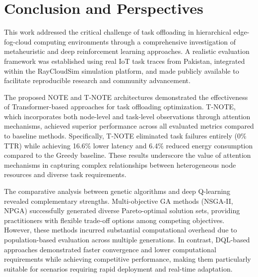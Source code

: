 \documentclass[preprint,3p,authoryear]{elsarticle}
\begin{document}



\section{Conclusion and Perspectives}\label{sec:conclusion}

This work addressed the critical challenge of task offloading in hierarchical edge-fog-cloud computing environments through a comprehensive investigation of metaheuristic and deep reinforcement learning approaches. A realistic evaluation framework was established using real IoT task traces from Pakistan, integrated within the RayCloudSim simulation platform, and made publicly available to facilitate reproducible research and community advancement.

The proposed NOTE and T-NOTE architectures demonstrated the effectiveness of Transformer-based approaches for task offloading optimization. T-NOTE, which incorporates both node-level and task-level observations through attention mechanisms, achieved superior performance across all evaluated metrics compared to baseline methods. Specifically, T-NOTE eliminated task failures entirely (0\% TTR) while achieving 16.6\% lower latency and 6.4\% reduced energy consumption compared to the Greedy baseline. These results underscore the value of attention mechanisms in capturing complex relationships between heterogeneous node resources and diverse task requirements.

The comparative analysis between genetic algorithms and deep Q-learning revealed complementary strengths. Multi-objective GA methods (NSGA-II, NPGA) successfully generated diverse Pareto-optimal solution sets, providing practitioners with flexible trade-off options among competing objectives. However, these methods incurred substantial computational overhead due to population-based evaluation across multiple generations. In contrast, DQL-based approaches demonstrated faster convergence and lower computational requirements while achieving competitive performance, making them particularly suitable for scenarios requiring rapid deployment and real-time adaptation.
\end{document}

